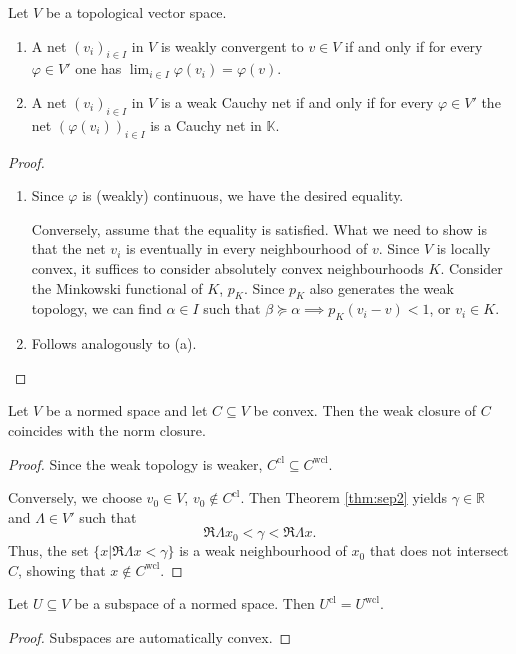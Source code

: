 \documentclass[twoside,symmetric, openany, 12pt]{./tuftebook}
\theoremstyle{definition}
\theoremstyle{definition}
\theoremstyle{definition}
\newenvironment{parts}{\begin{enumerate}[label=(\alph*)]}{\end{enumerate}}
\newcommand{\R}{\mathbb{R}}
\begin{document}
\begin{Theorem}
	Let $V$ be a topological vector space.
	\begin{parts}
		\item A net $(v_i)_{i\in I}$ in $V$ is weakly convergent to $v\in V$ if and only if for every $\varphi\in V'$ one has $\lim_{i \in I} \varphi(v_i)=\varphi(v)$.
		\item A net $(v_i)_{i\in I}$ in $V$ is a weak Cauchy net if and only if for every $\varphi \in V'$ the net $(\varphi(v_i))_{i\in I}$ is a Cauchy net in $\mathbb{K}$.
	\end{parts}
\end{Theorem}
\begin{proof}
	\begin{parts}
		\item Since $\varphi$ is (weakly) continuous, we have the desired equality. 
		
		Conversely, assume that the equality is satisfied. What we need to show is that the net $v_i$ is eventually in every neighbourhood of $v$. Since $V$ is locally convex, it suffices to consider absolutely convex neighbourhoods $K$. Consider the Minkowski functional of $K$, $p_K$. Since $p_K$ also generates the weak topology, we can find $\alpha\in I$ such that $\beta\succeq \alpha \implies p_K(v_i-v)<1$, or $v_i\in K$.
		\item Follows analogously to (a).\qedhere
	\end{parts}
\end{proof}
\begin{Theorem}
	Let $V$ be a normed space and let $C\subseteq V$ be convex. Then the weak closure of $C$ coincides with the norm closure.
\end{Theorem}
\begin{proof}
	Since the weak topology is weaker, $C^\text{cl}\subseteq C^\text{wcl}$.
	
	Conversely, we choose $v_0\in V$, $v_0\not\in C^\text{cl}$. Then Theorem \ref{thm:sep2} yields $\gamma\in \R$ and $\Lambda\in V'$ such that
	\[\Re \Lambda x_0<\gamma < \Re \Lambda x.\]
	Thus, the set $\{x|\Re \Lambda x< \gamma\}$ is a weak neighbourhood of $x_0$ that does not intersect $C$, showing that $x\not\in C^\text{wcl}$. 
\end{proof}
\begin{Corollary}
	Let $U\subseteq V$ be a subspace of a normed space. Then $U^\text{cl}=U^\text{wcl}$.
\end{Corollary}
\begin{proof}
	Subspaces are automatically convex.
\end{proof}
\end{document}
